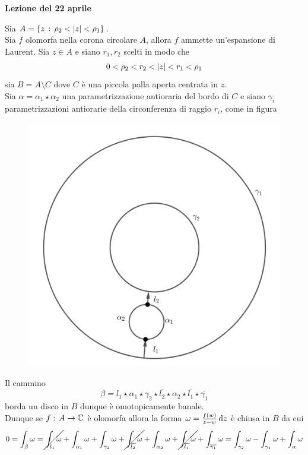 

\textbf{Lezione del 22 aprile}
\begin{thm}Sia $A=\{ z \, : \, \rho_2< \left\vert z \right\vert <\rho_1\}$.\\
Sia $f$ olomorfa nella corona circolare $A$, allora $f$ ammette un'espansione di Laurent.
\proof Sia $z\in A$ e siano $r_1,r_2$ scelti in modo che 
$$ 0<\rho_2 < r_2 < \left\vert z \right\vert < r_1< \rho_1$$  
sia $B = A\setminus C$ dove $C$ \`e una piccola palla aperta centrata in $z$.\\
Sia $\alpha=\alpha_1\star \alpha_2$ una parametrizzazione  antioraria del bordo di $C$ e siano $\gamma_i$  parametrizzazioni antiorarie della circonferenza di raggio $r_i$, come in figura
\begin{figure}[!h]
\centering
\includegraphics[scale=0.2]{Figure/04_22}
\end{figure}
Il cammino 
$$ \beta=l_1 \star \alpha_1 \star \gamma_2 \star \overline{l_2} \star \alpha_2 \star \overline{l_1}\star \overline{\gamma_1}$$
borda un disco in $B$ dunque \`e omotopicamente banale.\\
Dunque se $f:\, A \to \mathbb{C}$ \`e olomorfa allora la forma $\omega=\frac{f(w)}{z-w} \, \mathrm{d}z $ \`e chiusa  in  $B$  da cui
$$ 0 =\int_\beta \omega  = \cancel{\int_{l_1} \omega } + \int_{\alpha_1} \omega +\int_{\gamma_2} \omega + \cancel{\int_{\overline{l_2}}\omega} +\int_{\alpha_2} \omega + \cancel{\int_{\overline{l_1}} \omega} + \int_{\overline{\gamma_1}} \omega = \int_{\gamma_2} \omega - \int_{\gamma_1} \omega +\int_\alpha \omega $$

\end{thm}
